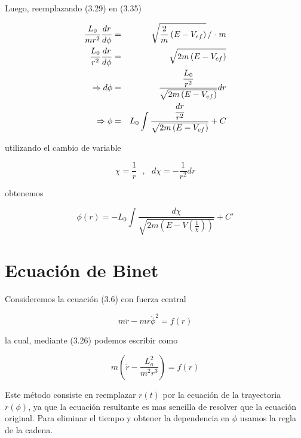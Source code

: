 \documentclass[12pt]{report}
\begin{document}
Luego, reemplazando (3.29) en (3.35)

\begin{eqnarray}
\frac{L_0}{mr^2} \frac{dr}{d\phi} &=& \sqrt{\frac{2}{m} \left( E - V_{ef} \right)} \left/ \right. \cdot m \\
\frac{L_0}{r^2} \frac{dr}{d\phi} &=& \sqrt{2m \left( E-V_{ef} \right)} \\
\Rightarrow d\phi&=& \displaystyle \frac{\displaystyle\frac{L_0}{r^2}}{\sqrt{2m \left( E-V_{ef} \right)}}dr \\
\Rightarrow \phi &=& L_0 \int \displaystyle \frac{\displaystyle\frac{dr}{r^2}}{\sqrt{2m \left( E-V_{ef} \right)}} + C
\end{eqnarray}


utilizando el cambio de variable

\begin{equation}
\chi=\frac{1}{r} \ \ \ , \ \ \  d\chi=-\frac{1}{r^2} dr
\end{equation}

obtenemos

\begin{equation}
\phi(r)=-L_0 \int \frac{d\chi}{\sqrt{2m \left( E-V\left(\frac{1}{\chi}\right) \right)}} + C'
\end{equation}











\section{Ecuación de Binet}

Consideremos la ecuación (3.6) con fuerza central

\begin{equation}
m \ddot{r} -mr \dot{\phi}^2 = f(r)
\end{equation}

la cual, mediante (3.26) podemos escribir como

\begin{equation}
m \left( \ddot{r} - \frac{L_o^2}{m^2 r^3} \right) = f(r)
\end{equation}

Este método consiste en reemplazar $r(t)$ por la ecuación de la trayectoria $r(\phi)$, ya que la ecuación resultante es mas sencilla de resolver que la ecuación original. Para eliminar el tiempo y obtener la dependencia en $\phi$ usamos la regla de la cadena. \\
\\
\end{document}
